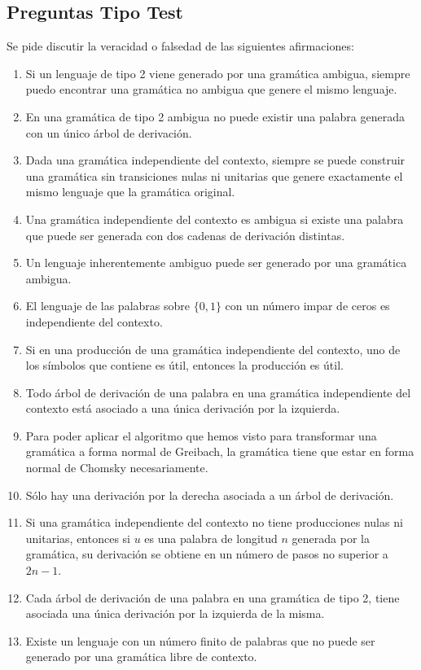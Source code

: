 \subsection{Preguntas Tipo Test}
Se pide discutir la veracidad o falsedad de las siguientes afirmaciones:
\begin{enumerate}
    \item Si un lenguaje de tipo 2 viene generado por una gramática ambigua, siempre puedo encontrar una gramática no ambigua que genere el mismo lenguaje.
    \item En una gramática de tipo 2 ambigua no puede existir una palabra generada con un único árbol de derivación.
    \item Dada una gramática independiente del contexto, siempre se puede construir una gramática sin transiciones nulas ni unitarias que genere exactamente el mismo lenguaje que la gramática original.
    \item Una gramática independiente del contexto es ambigua si existe una palabra que puede ser generada con dos cadenas de derivación distintas.  
    \item Un lenguaje inherentemente ambiguo puede ser generado por una gramática ambigua.
    \item El lenguaje de las palabras sobre $\{0,1\}$ con un número impar de ceros es independiente del contexto.
    \item Si en una producción de una gramática independiente del contexto, uno de los símbolos que contiene es útil, entonces la producción es útil.
    \item Todo árbol de derivación de una palabra en una gramática independiente del contexto está asociado a una única derivación por la izquierda.
    \item Para poder aplicar el algoritmo que hemos visto para transformar una gramática a forma normal de Greibach, la gramática tiene que estar en forma normal de Chomsky necesariamente.
    \item Sólo hay una derivación por la derecha asociada a un árbol de derivación.
    \item Si una gramática independiente del contexto no tiene producciones nulas ni unitarias, entonces si $u$ es una palabra de longitud $n$ generada por la gramática, su derivación se obtiene en un número de pasos no superior a $2n-1$.
    \item Cada árbol de derivación de una palabra en una gramática de tipo 2, tiene asociada una única derivación por la izquierda de la misma.
    \item Existe un lenguaje con un número finito de palabras que no puede ser generado por una gramática libre de contexto.

\end{enumerate}
